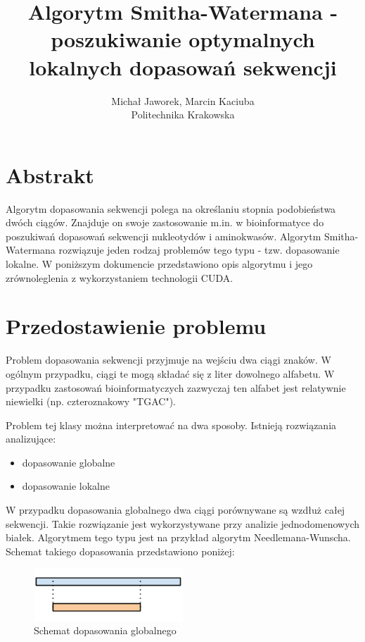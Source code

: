 \documentclass[a4paper,12pt]{article}
\newenvironment{lista}{
\begin{itemize}
  \setlength{\itemsep}{1pt}
  \setlength{\parskip}{0pt}
  \setlength{\parsep}{0pt}
}{\end{itemize}}
\begin{document}
\noindent



\title{Algorytm Smitha-Watermana - poszukiwanie optymalnych lokalnych dopasowań sekwencji }
\author{Michał Jaworek, Marcin Kaciuba\\ Politechnika Krakowska}
\maketitle



\section*{Abstrakt}
Algorytm dopasowania sekwencji polega na określaniu stopnia podobieństwa dwóch ciągów. Znajduje on swoje zastosowanie m.in. w bioinformatyce do poszukiwań dopasowań sekwencji nukleotydów i aminokwasów. Algorytm Smitha-Watermana rozwiązuje jeden rodzaj problemów tego typu - tzw. dopasowanie lokalne. W poniższym dokumencie przedstawiono opis algorytmu i jego zrównoleglenia z wykorzystaniem technologii CUDA. 

\section*{Przedostawienie problemu}

Problem dopasowania sekwencji przyjmuje na wejściu dwa ciągi znaków. W ogólnym przypadku, ciągi te mogą składać się z liter dowolnego alfabetu. W przypadku zastosowań bioinformatyczych zazwyczaj ten alfabet jest relatywnie niewielki (np. czteroznakowy "TGAC"). 

Problem tej klasy można interpretować na dwa sposoby. Istnieją rozwiązania analizujące:
\begin{lista}
 \item dopasowanie globalne
\item dopasowanie lokalne
\end{lista}

W przypadku dopasowania globalnego dwa ciągi porównywane są wzdłuż całej sekwencji. Takie rozwiązanie jest wykorzystywane przy analizie jednodomenowych białek. Algorytmem tego typu jest na przykład algorytm Needlemana-Wunscha. Schemat takiego dopasowania przedstawiono poniżej: 

\begin{figure}[H]
  \vspace{5pt}
  \centering
  \begin{center}
  \includegraphics[width=0.5\textwidth]{images/Dopasowanie_globalne.png}
  \end{center}
  \caption{Schemat dopasowania globalnego}
 \end{figure}
  
\end{document}
